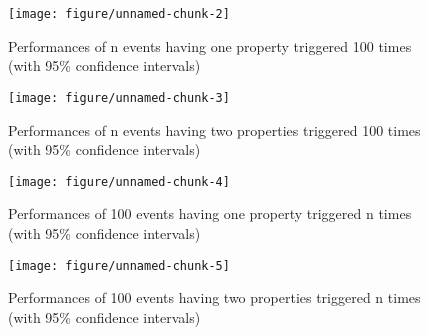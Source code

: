 \clearpage

\begin{figure}[tp]
\begin{knitrout}
\color{fgcolor}
\texttt{[image: figure/unnamed-chunk-2]} 

\end{knitrout}

\caption{Performances of n events having one property triggered 100 times \\ (with 95\% confidence intervals)}
\label{fig:E.SP.Performance}
\end{figure}

\begin{figure}[tp]
\begin{knitrout}
\color{fgcolor}
\texttt{[image: figure/unnamed-chunk-3]} 

\end{knitrout}

\caption{Performances of n events having two properties triggered 100 times \\ (with 95\% confidence intervals)}
\label{fig:E.TP.Performance}
\end{figure}

\clearpage

\begin{figure}[tp]
\begin{knitrout}
\color{fgcolor}
\texttt{[image: figure/unnamed-chunk-4]} 

\end{knitrout}

\caption{Performances of 100 events having one property triggered n times \\ (with 95\% confidence intervals)}
\label{fig:T.SP.Performance}
\end{figure}

\begin{figure}[tp]
\begin{knitrout}
\color{fgcolor}
\texttt{[image: figure/unnamed-chunk-5]} 

\end{knitrout}

\caption{Performances of 100 events having two properties triggered n times \\ (with 95\% confidence intervals)}
\label{fig:T.TP.Performance}
\end{figure}
